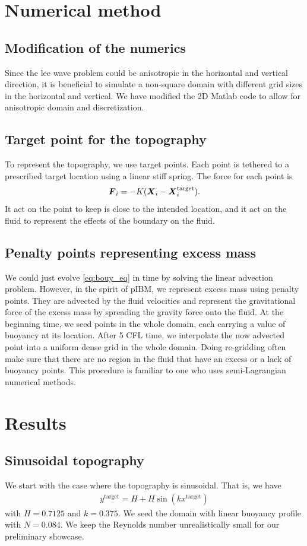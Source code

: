 \documentclass[11pt,letterpaper]{article}
\begin{document}
\section{Numerical method}
\subsection{Modification of the numerics}
Since the lee wave problem could be anisotropic in the horizontal and vertical direction, it is beneficial to simulate a non-square domain with different grid sizes in the horizontal and vertical. We have modified the 2D Matlab code to allow for anisotropic domain and discretization. 

\subsection{Target point for the topography}
To represent the topography, we use target points. Each point is tethered to a prescribed target location using a linear stiff spring. The force for each point is
\begin{align}
    \boldsymbol{F}_i = -K(\boldsymbol{X}_i-\boldsymbol{X}_i^\text{target}).
\end{align}
It act on the point to keep is close to the intended location, and it act on the fluid to represent the effects of the boundary on the fluid.

\subsection{Penalty points representing excess mass}\label{sec:pIBM}
We could just evolve \eqref{eq:bouy_eq} in time by solving the linear advection problem. However, in the spirit of pIBM, we represent excess mass using penalty points. They are advected by the fluid velocities and represent the gravitational force of the excess mass by spreading the gravity force onto the fluid. At the beginning time, we seed points in the whole domain, each carrying a value of buoyancy at its location. After 5 CFL time, we interpolate the now advected point into a uniform dense grid in the whole domain. Doing re-gridding often make sure that there are no region in the fluid that have an excess or a lack of buoyancy points. This procedure is familiar to one who uses semi-Lagrangian numerical methods. 

\section{Results}
\subsection{Sinusoidal topography}
We start with the case where the topography is sinusoidal. That is, we have
\begin{align}
    y^\text{target} = H+H\sin(k x^\text{target})
\end{align}
with $H=0.7125$ and $k=0.375$. We seed the domain with linear buoyancy profile with $N=0.084$. We keep the Reynolds number unrealistically small for our preliminary showcase.
\end{document}
